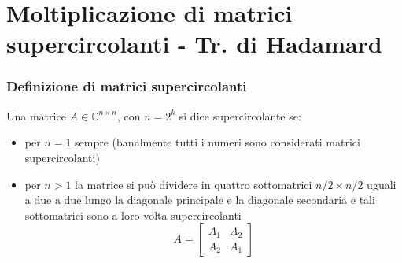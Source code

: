 \section{Moltiplicazione di matrici supercircolanti - Tr. di Hadamard}
\subsubsection*{Definizione di matrici supercircolanti}
Una matrice \(A \in \mathbb{C}^{n \times n}\), con \(n=2^k\) si dice supercircolante se:
\begin{itemize}
	\item per \(n = 1\) sempre (banalmente tutti i numeri sono considerati matrici supercircolanti)
	\item per \(n > 1\) la matrice si può dividere in quattro sottomatrici \(n/2 \times n/2\) uguali a due a due lungo la diagonale
	principale e la diagonale secondaria e tali sottomatrici sono a loro volta supercircolanti
	\[A = \begin{bmatrix} A_1 & A_2 \\ A_2 & A_1 \end{bmatrix} \]
\end{itemize}

